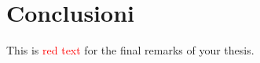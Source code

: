 \documentclass[../main.tex]{subfiles}
\begin{document}
\chapter{Conclusioni}
\label{chap:conclusion}

This is \textcolor{red}{red text} for the final remarks of your thesis.
\end{document}
